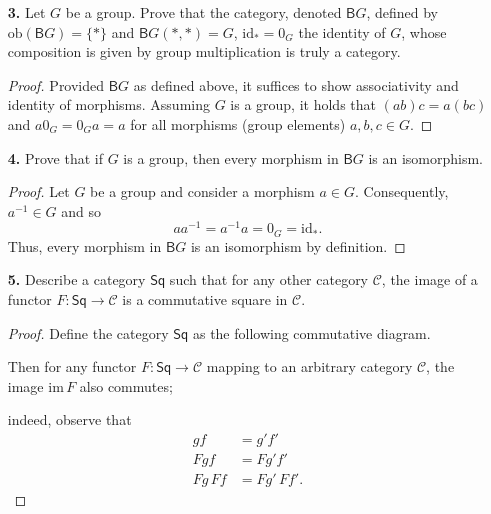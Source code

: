 \documentclass[ 12pt ]{article}
\begin{document}
\begin{enumerate}
	\item[\textbf{3.}] Let $G$ be a group. Prove that the category, denoted $\mathsf{B}G$, defined by $\mathrm{ob}(\mathsf{B}G) = \{ \ast \}$ and $\mathsf{B}G(\ast, \ast) = G$, $\mathrm{id}_\ast = 0_G$ the identity of $G$, whose composition is given by group multiplication is truly a category. 

		\begin{proof}
			Provided $\mathsf{B}G$ as defined above, it suffices to show associativity and identity of morphisms. Assuming $G$ is a group, it holds that $(ab)c = a(bc)$ and $a 0_G = 0_G a = a$ for all morphisms (group elements) $a, b, c \in G$.
		\end{proof}


	\item[\textbf{4.}] Prove that if $G$ is a group, then every morphism in $\mathsf{B}G$ is an isomorphism.

		\begin{proof}
			Let $G$ be a group and consider a morphism $a \in G$. Consequently, $a^{-1} \in G$ and so $$aa^{-1} = a^{-1}a = 0_G = \mathrm{id}_\ast.$$ Thus, every morphism in $\mathsf{B}G$ is an isomorphism by definition.
		\end{proof}


	\item[\textbf{5.}] Describe a category $\mathsf{Sq}$ such that for any other category $\mathscr{C}$, the image of a functor $F : \mathsf{Sq} \to \mathscr{C}$ is a commutative square in $\mathscr{C}$. 

		\begin{proof}
			Define the category $\mathsf{Sq}$ as the following commutative diagram.
			\begin{center}
			\end{center}
			Then for any functor $F : \mathsf{Sq} \to \mathscr{C}$ mapping to an arbitrary category $\mathscr{C}$, the image $\mathrm{im}\, F$ also commutes;
			\begin{center}
			\end{center}
			indeed, observe that
			\begin{align*}
				gf &= g'f' \\
				F gf &= F g'f' \\
				Fg\, Ff &= Fg'\, Ff'.
			\end{align*}
		\end{proof}



\end{enumerate}
\end{document}
